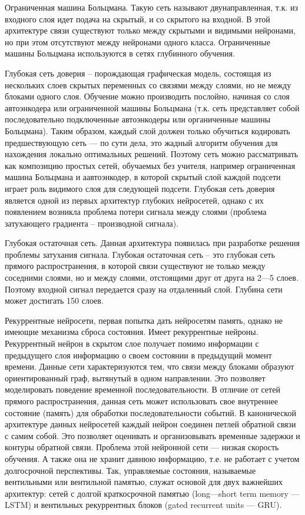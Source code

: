     Ограниченная машина Больцмана. Такую сеть называют двунаправленная, т.к. из входного слоя идет подача на скрытый, и со скрытого на входной. В этой архитектуре связи существуют только между скрытыми и видимыми нейронами, но при этом отсутствуют между нейронами одного класса. Ограниченные машины Больцмана используются в сетях глубинного обучения. 
    
    Глубокая сеть доверия – порождающая графическая модель, состоящая из нескольких слоев скрытых переменных со связями между слоями, но не между блоками одного слоя. Обучение можно производить послойно, начиная со слоя автоэнкодера или ограниченной машины Больцмана (т.к. сеть представляет собой последовательно подключенные автоэнкодеры или органиченные машины Больцмана). Таким образом, каждый слой должен только обучиться кодировать предшествующую сеть — по сути дела, это жадный алгоритм обучения для нахождения локально оптимальных решений. Поэтому сеть можно рассматривать как композицию простых сетей, обучаемых без учителя, например ограниченная машина Больцмана и аавтоэнкодер, в которой скрытый слой каждой подсети играет роль видимого слоя для следующей подсети. Глубокая сеть доверия является одной из первых архитектур глубоких нейросетей, однако с их появлением возникла проблема потери сигнала между слоями (проблема затухающего градиента – производной сигнала).
    
    Глубокая остаточная сеть. Данная архитектура появилась при разработке решения проблемы затухания сигнала. Глубокая остаточная сеть – это глубокая сеть прямого распространения, в которой связи существуют не только между соседними слоями, но и между слоями, отстоящими друг от друга на 2—5 слоев. Поэтому входной сигнал передается сразу на отдаленный слой. Глубина сети может достигать 150 слоев.
    
    Рекуррентные нейросети, первая попытка дать нейросетям память, однако не имеющие механизма сброса состояния. Имеет рекуррентные нейроны. Рекуррентный нейрон в скрытом слое получает помимо информации с предыдущего слоя информацию о своем состоянии в предыдущий момент времени. Данные сети характеризуются тем, что связи между блоками образуют ориентированный граф, вытянутый в одном направлении. Это позволяет моделировать поведение временной последовательности. В отличие от сетей прямого распространения, данная сеть может использовать свое внутреннее состояние (память) для обработки последовательности событий. В канонической архитектуре данных нейросетей каждый нейрон соединен петлей обратной связи с самим собой. Это позволяет оценивать и организовывать временные задержки и контуры обратной связи. Проблема этой нейронной сети — низкая скорость обучения. А также она не хранит давнюю информацию, т.е. не работает с учетом долгосрочной перспективы. Так, управляемые состояния, называемые вентильными или вентильной памятью, служат основой для двух важнейших архитектур: сетей с долгой краткосрочной памятью (long—short term memory — LSTM) и вентильных рекуррентных блоков (gated recurrent units — GRU). 
    
